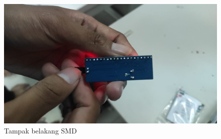 \begin{figure}[h]
  \centering
  \includegraphics[width=0.8\linewidth]{img/smd-back.jpeg}
  \caption{Tampak belakang SMD} 
  \label{fig:smd-back}
\end{figure}

